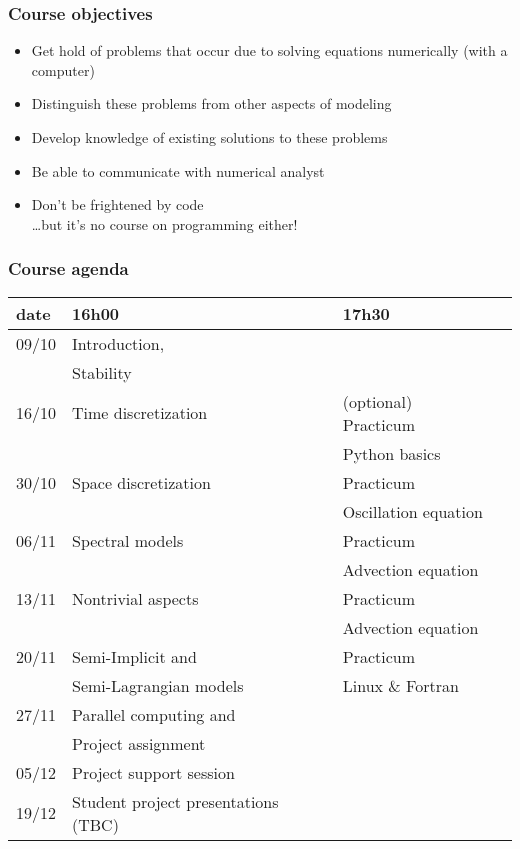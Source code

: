 \documentclass[aspectratio=43,9pt]{beamer}
\begin{document}
%
%
\begin{frame}
	\frametitle{Course objectives}
	\begin{itemize}
		\item Get hold of problems that occur due to solving equations numerically (with a computer)\\[3ex]
\pause
		\item Distinguish these problems from other aspects of modeling
		\item Develop knowledge of existing solutions to these problems
		\item Be able to communicate with numerical analyst\\[3ex]
\pause
		\item Don't be frightened by code\\ \quad\ldots but it's no course on programming either!
	\end{itemize}
\end{frame}
%
%
\begin{frame}
	\frametitle{Course agenda}
	\vspace*{-5mm}
	\begin{center}
		\def\arraystretch{1.3}
		\begin{tabular}{l|lll}
			date	&	16h00	&	17h30 \\
		\hline
			09/10 	& Introduction, \\[-4pt]
					& Stability	\\
			16/10	& Time discretization		&	(optional) Practicum	\\[-4pt]
					&							&	Python basics			\\
			30/10	& Space discretization		&	Practicum				\\[-4pt]
					& 							&	Oscillation equation	\\
			06/11	& Spectral models			& 	Practicum				\\[-4pt]
					&							&	Advection equation 		\\
			13/11	& Nontrivial aspects		&	Practicum				\\[-4pt]
					& 							&	Advection equation		\\
			20/11	& Semi-Implicit and		 	&	Practicum				\\[-4pt]
					& Semi-Lagrangian models	&	Linux \& Fortran		\\
			27/11	& Parallel computing and	&							\\[-4pt]
					& Project assignment		&							\\
		\hline
			05/12	& Project support session	\\
			19/12	& Student project presentations (TBC)
		\end{tabular}
		\def\arraystretch{1}
	\end{center}
\end{frame}
\end{document}
